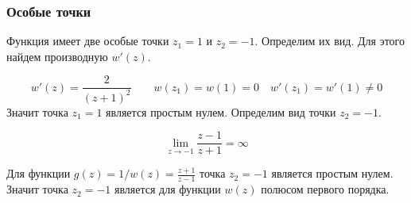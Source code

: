 \begin{frame}\frametitle{Особые точки}
	Функция имеет две особые точки \(z_1 = 1\) и \(z_2 = -1\).
	Определим их вид.
	Для этого найдем производную \(w'(z)\).

	\[
		w'(z) = \frac{2}{(z+1)^2}
		\qquad
		w(z_1) = w(1) = 0
		\quad
		w'(z_1) = w'(1) \neq 0
	\]
	Значит точка \(z_1 = 1\) является простым нулем.
	Определим вид точки \(z_2 = -1\).

	\[ \lim_{z \to -1} \frac{z-1}{z+1} = \infty \]

	Для функции \(g(z) = 1/w(z) = \frac{z+1}{z-1}\)
	точка \(z_2 = -1\) является простым нулем.
	Значит точка \(z_2 = -1\) является для функции \(w(z)\) полюсом первого порядка.

\end{frame}
